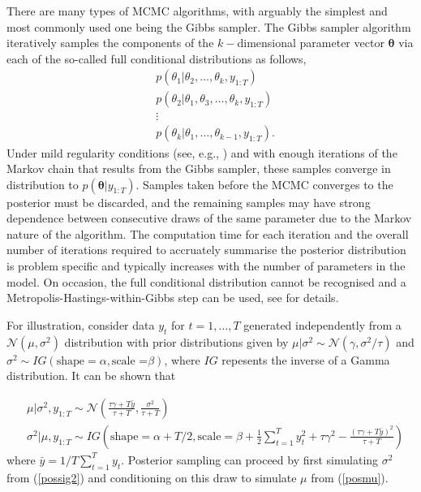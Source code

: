 \documentclass[12pt,a4paper]{article}%
\numberwithin{equation}{section}
\begin{document}
There are many types of MCMC algorithms, with arguably the simplest and most commonly used one being the Gibbs sampler. The Gibbs sampler algorithm iteratively samples the components of the $k-$dimensional parameter vector $\boldsymbol{\theta}$ via each of the so-called full conditional distributions as follows,
\begin{align}
&p(\theta_1 | \theta_2, \dots, \theta_k, y_{1:T}) \nonumber \\
&p(\theta_2 | \theta_1, \theta_3, \dots, \theta_k, y_{1:T}) \nonumber \\
&\vdots \nonumber \\
&p(\theta_k | \theta_1, \dots, \theta_{k-1}, y_{1:T}). \nonumber
\end{align}
Under mild regularity conditions (see, e.g., \citet{Tierney1994}) and with enough iterations of the Markov chain that results from the Gibbs sampler, these samples converge in distribution to $p(\boldsymbol{\theta} | y_{1:T})$. Samples taken before the MCMC converges to the posterior must be discarded, and the remaining samples may have strong dependence between consecutive draws of the same parameter due to the Markov nature of the algorithm. The computation time for each iteration and the overall number of iterations required to accruately summarise the posterior distribution is problem specific and typically increases with the number of parameters in the model. On occasion, the full conditional distribution cannot be recognised and a Metropolis-Hastings-within-Gibbs step can be used, see \citet{Gilks1995} for details.

For illustration, consider data $y_t$ for $t = 1, \dots, T$ generated independently from a $\mathcal{N}(\mu, \sigma^2)$ distribution with prior distributions given by $\mu | \sigma^2 \sim \mathcal{N}(\gamma, \sigma^2/\tau)$ and $\sigma^2 \sim IG(\mbox{shape} = \alpha, \mbox{scale =}\beta)$, where $IG$ repesents the inverse of a Gamma distribution. It can be shown that

\begin{align}
&\mu | \sigma^2, y_{1:T} \sim \mathcal{N} \left(\frac{\tau\gamma + T\bar{y}}{\tau + T}, \frac{\sigma^2}{\tau  + T} \right) \label{posmu} \\
&\sigma^2 | \mu, y_{1:T} \sim IG  \left( \mbox{shape} = \alpha + T/2, \mbox{scale} = \beta + \frac{1}{2}\sum_{t=1}^{T}y_t^2 + \tau\gamma^2 - \frac{(\tau\gamma + T\bar{y})^2}{\tau + T} \right) \label{possig2} 
\end{align}
where $\bar{y} = 1/T \sum_{t=1}^{T}y_t$. Posterior sampling can proceed by first simulating $\sigma^2$ from (\ref{possig2}) and conditioning on this draw to simulate $\mu$ from (\ref{posmu}).
\end{document}
